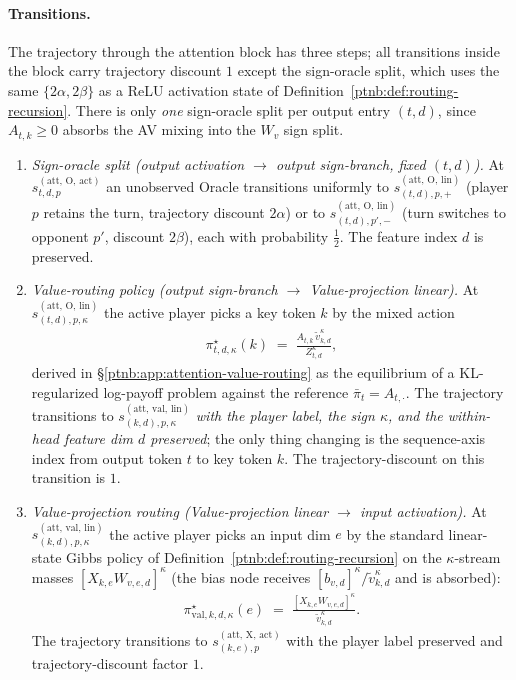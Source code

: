 \paragraph{Transitions.} The trajectory through the attention block has three steps; all transitions inside the block carry
trajectory discount $1$ except the sign-oracle split, which uses the same $\{2\alpha, 2\beta\}$ as
a ReLU activation state of Definition~\ref{ptnb:def:routing-recursion}. There is only \emph{one}
sign-oracle split per output entry $(t,d)$, since $A_{t,k} \ge 0$ absorbs the AV mixing into the
$W_v$ sign split.
\begin{enumerate}
    \item \emph{Sign-oracle split (output activation $\to$ output sign-branch, fixed $(t,d)$).} At
        $s_{t,d,p}^{(\mathrm{att},\,\mathrm{O},\,\mathrm{act})}$ an unobserved Oracle transitions uniformly
        to $s_{(t,d),p,+}^{(\mathrm{att},\,\mathrm{O},\,\mathrm{lin})}$ (player $p$ retains the turn,
        trajectory discount $2\alpha$) or to $s_{(t,d),p',-}^{(\mathrm{att},\,\mathrm{O},\,\mathrm{lin})}$
        (turn switches to opponent $p'$, discount $2\beta$), each with probability $\tfrac12$. The feature
        index $d$ is preserved.
    \item \emph{Value-routing policy (output sign-branch $\to$ Value-projection linear).} At
        $s_{(t,d),p,\kappa}^{(\mathrm{att},\,\mathrm{O},\,\mathrm{lin})}$ the active player picks a key
        token $k$ by the mixed action
        \begin{align}\label{ptnb:eq:attn-V-routing-policy-O}
            \pi_{t,d,\kappa}^\star(k)
            \;=\; \frac{A_{t,k}\, \tilde{v}_{k,d}^\kappa}{Z_{t,d}^\kappa},
        \end{align}
        derived in \S\ref{ptnb:app:attention-value-routing} as the equilibrium of a KL-regularized log-payoff
        problem against the reference $\bar\pi_t = A_{t,\cdot}$. The trajectory transitions to
        $s_{(k,d),p,\kappa}^{(\mathrm{att},\,\mathrm{val},\,\mathrm{lin})}$ \emph{with the player label,
        the sign $\kappa$, and the within-head feature dim $d$ preserved}; the only thing changing is the
        sequence-axis index from output token $t$ to key token $k$. The trajectory-discount on this
        transition is $1$.
    \item \emph{Value-projection routing (Value-projection linear $\to$ input activation).} At
        $s_{(k,d),p,\kappa}^{(\mathrm{att},\,\mathrm{val},\,\mathrm{lin})}$ the active player picks an
        input dim $e$ by the standard linear-state Gibbs policy of Definition~\ref{ptnb:def:routing-recursion}
        on the $\kappa$-stream masses $[X_{k,e}W_{v,e,d}]^\kappa$ (the bias node receives
        $[b_{v,d}]^\kappa/\tilde{v}_{k,d}^\kappa$ and is absorbed):
        \begin{align}\label{ptnb:eq:attn-V-routing-policy}
            \pi_{\mathrm{val},k,d,\kappa}^\star(e)
            \;=\; \frac{[X_{k,e} W_{v,e,d}]^\kappa}{\tilde{v}_{k,d}^\kappa}.
        \end{align}
        The trajectory transitions to $s_{(k,e),p}^{(\mathrm{att},\,\mathrm{X},\,\mathrm{act})}$ with the
        player label preserved and trajectory-discount factor $1$.
\end{enumerate}
